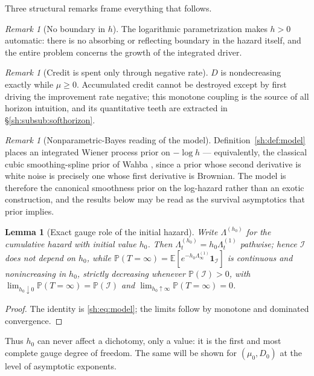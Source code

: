\documentclass[11pt]{article}
\numberwithin{equation}{section}
\theoremstyle{plain}
\newtheorem{lemma}[theorem]{Lemma}
\theoremstyle{definition}
\theoremstyle{remark}
\newtheorem{remark}[theorem]{Remark}
\newcommand{\E}{\mathbb{E}}
\newcommand{\PP}{\mathbb{P}}
\newcommand{\one}{\mathbf{1}}
\newcommand{\Imm}{\mathcal{I}}
\begin{document}
Three structural remarks frame everything that follows.

\begin{remark}[No boundary in $h$]\label{sh:rem:noboundary}
The logarithmic parametrization makes $h>0$ automatic: there is no absorbing
or reflecting boundary in the hazard itself, and the entire problem concerns
the growth of the integrated driver.
\end{remark}

\begin{remark}[Credit is spent only through negative rate]\label{sh:rem:monot}
$D$ is nondecreasing exactly while $\mu\ge0$. Accumulated credit cannot be
destroyed except by first driving the improvement rate negative; this
monotone coupling is the source of all horizon intuition, and its
quantitative teeth are extracted in \S\ref{sh:subsub:softhorizon}.
\end{remark}

\begin{remark}[Nonparametric-Bayes reading of the model]\label{sh:rem:iwp}
Definition~\ref{sh:def:model} places an integrated Wiener process prior on
$-\log h$ --- equivalently, the classical cubic smoothing-spline prior of
Wahba \cite{Wah78}, since a prior whose second derivative is white noise
is precisely one whose first derivative is Brownian. The model is
therefore the canonical smoothness prior on the log-hazard rather than an
exotic construction, and the results below may be read as the survival
asymptotics that prior implies.
\end{remark}

\begin{lemma}[Exact gauge role of the initial hazard]\label{sh:lem:hgauge}
Write $\Lambda^{(h_0)}$ for the cumulative hazard with initial value $h_0$.
Then $\Lambda^{(h_0)}_t=h_0\Lambda^{(1)}_t$ pathwise; hence $\Imm$ does not
depend on $h_0$, while
$\PP(T=\infty)=\E[e^{-h_0\Lambda^{(1)}_\infty}\one_\Imm]$ is continuous and
nonincreasing in $h_0$, strictly decreasing whenever $\PP(\Imm)>0$, with
$\lim_{h_0\downarrow0}\PP(T=\infty)=\PP(\Imm)$ and
$\lim_{h_0\uparrow\infty}\PP(T=\infty)=0$.
\end{lemma}

\begin{proof}
The identity is \eqref{sh:eq:model}; the limits follow by monotone and
dominated convergence.
\end{proof}

Thus $h_0$ can never affect a dichotomy, only a value: it is the first and
most complete gauge degree of freedom. The same will be shown for
$(\mu_0,D_0)$ at the level of asymptotic exponents.
\end{document}
